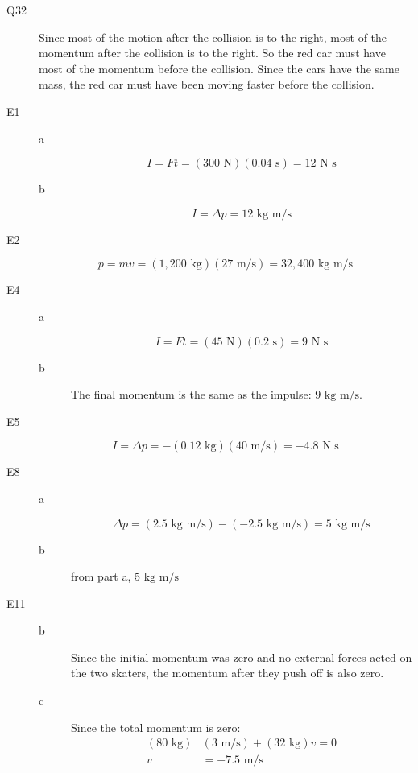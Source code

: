 \documentclass{exam}
\begin{document}
\begin{description}
\item[Q32]
Since most of the motion after the collision is to the right, most of the momentum after the collision is to the right.
So the red car must have most of the momentum before the collision.  Since the cars have the same mass, the red car must
have been moving faster before the collision.

\item[E1]
\begin{description}
\item[a]
\[
  I = Ft = (300 \text{ N})(0.04 \text{ s}) = 12 \text{ N s} 
\]

\item[b]
\[
  I = \Delta p = 12 \text{ kg m/s} 
\]
\end{description}

\item[E2]
\[
  p = mv = (1,200 \text{ kg})(27 \text{ m/s}) = 32,400 \text{ kg m/s}
\]

\item[E4]
\begin{description}
\item[a] 
\[
  I = Ft = (45 \text{ N})(0.2 \text{ s}) = 9 \text{ N s}
\]

\item[b] 
The final momentum is the same as the impulse: $9 \text{ kg m/s}$.

\end{description}

\item[E5]
\[
  I = \Delta p = - (0.12 \text{ kg})(40 \text{ m/s}) = -4.8 \text{ N s}
\]

\item[E8]
\begin{description}
\item[a]
\[
  \Delta p = (2.5 \text{ kg m/s}) - (- 2.5 \text{ kg m/s}) = 5 \text{ kg m/s}
\]

\item[b] from part a, $5 \text{ kg m/s}$
\end{description}

\item[E11]
\begin{description}
\item[b] 
Since the initial momentum was zero and no external forces acted on the two skaters, the momentum after they push
off is also zero.

\item[c]

Since the total momentum is zero:
\begin{align*}
  (80 \text{ kg}) & (3 \text{ m/s}) + (32 \text{ kg}) v = 0 \\
  v &= - 7.5 \text{ m/s} \\
\end{align*}


\end{description}
\end{description}
\end{document}
